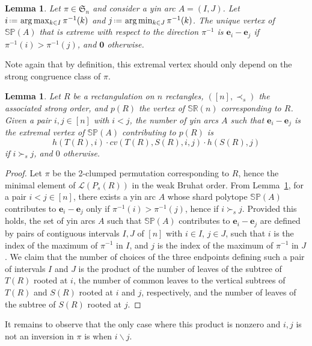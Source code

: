 \documentclass{amsart}
\newtheorem{lemma}[theorem]{Lemma}
\theoremstyle{definition}
\newcommand{\f}[1]{\mathfrak{#1}} %
\newcommand{\eqdef}{\mbox{\,\raisebox{0.2ex}{\scriptsize\ensuremath{\mathrm:}}\ensuremath{=}\,}} %
\newcommand{\polytope}[1]{\mathds{#1}} %
\newcommand{\SRP}{\polytope{SR}} %
\newcommand{\SP}{\polytope{SP}}
\begin{document}
\begin{lemma}
  \label{lem:yinminmax}
  Let $\pi\in\f{S}_n$ and consider a yin arc $A=(I,J)$.
  Let $i \eqdef \arg\max_{k\in I} \pi^{-1}(k)$ and $j \eqdef \arg\min_{k\in J} \pi^{-1}(k)$.
  The unique vertex of $\SP(A)$ that is extreme with respect to the direction $\pi^{-1}$
  is $\mathbf{e}_i-\mathbf{e}_j$ if $\pi^{-1}(i)>\pi^{-1}(j)$, and $\mathbf{0}$ otherwise.
\end{lemma}

Note again that by definition, this extremal vertex should only depend on the strong congruence class of $\pi$.

\begin{lemma}
  Let $R$ be a rectangulation on $n$ rectangles, $([n],\prec_s)$ the associated strong order, and $p(R)$ the vertex of $\SRP(n)$ corresponding to $R$.
  Given a pair $i,j\in [n]$ with $i<j$, the number of yin arcs $A$ such that $\mathbf{e}_i-\mathbf{e}_j$
  is the extremal vertex of $\SP(A)$ contributing to $p(R)$ is
  \[
    h(T(R), i) \cdot cv (T(R), S(R), i, j)\cdot h(S(R), j) 
  \]
  if $i\succ_s j$, and $0$ otherwise.
\end{lemma}
\begin{proof}
  Let $\pi$ be the 2-clumped permutation corresponding to $R$, hence the minimal element of $\mathcal{L}(P_s(R))$ in the weak Bruhat order.
  From Lemma~\ref{lem:yinminmax}, for a pair $i<j \in [n]$, there exists a yin arc $A$ whose shard polytope $\SP(A)$ contributes to $\mathbf{e}_i-\mathbf{e}_j$ only if
  $\pi^{-1}(i)>\pi^{-1}(j)$, hence if $i\succ_s j$.
  Provided this holds, the set of yin arcs $A$ such that $\SP(A)$ contributes to $\mathbf{e}_i-\mathbf{e}_j$ are defined by pairs of contiguous intervals $I,J$ of $[n]$ with $i\in I$, $j\in J$, such that $i$ is the index of the maximum of $\pi^{-1}$ in $I$, and $j$ is the index of the maximum of $\pi^{-1}$ in $J$.
  We claim that the number of choices of the three endpoints defining such a pair of intervals $I$ and $J$ is the product of the
  number of leaves of the subtree of $T(R)$ rooted at $i$, the number of common leaves to the vertical subtrees of $T(R)$ and $S(R)$ rooted
  at $i$ and $j$, respectively, and the number of leaves of the subtree of $S(R)$ rooted at $j$.
\end{proof}

It remains to observe that the only case where this product is nonzero and $i,j$ is not an inversion in $\pi$ is when $i\backslash j$.
\end{document}
